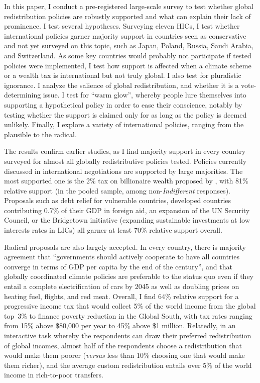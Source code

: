 \documentclass[12pt,english]{article}
\begin{document}
\begin{bibunit}
In this paper, I conduct a pre-registered large-scale survey to test whether global redistribution policies are robustly supported and what can explain their lack of prominence. I test several hypotheses. Surveying eleven HICs, I test whether international policies garner majority support in countries seen as conservative and not yet surveyed on this topic, such as Japan, Poland, Russia, Saudi Arabia, and Switzerland. As some key countries would probably not participate if tested policies were implemented, I test how support is affected when a climate scheme or a wealth tax is international but not truly global. I also test for pluralistic ignorance. I analyze the salience of global redistribution, and whether it is a vote-determining issue. I test for ``warm glow'', whereby people lure themselves into supporting a hypothetical policy in order to ease their conscience, notably by testing whether the support is claimed only for as long as the policy is deemed unlikely. Finally, I explore a variety of international policies, ranging from the plausible to the radical. %

The results confirm earlier studies, as I find majority support in every country surveyed for almost all globally redistributive policies tested. Policies currently discussed in international negotiations are supported by large majorities. The most supported one is the 2\% tax on billionaire wealth proposed by \cite{zucman_blueprint_2024}, with 81\% relative support (in the pooled sample, among non-\textit{Indifferent} responses). Proposals such as debt relief for vulnerable countries, developed countries contributing 0.7\% of their GDP in foreign aid, an expansion of the UN Security Council, or the Bridgetown initiative (expanding sustainable investments at low interests rates in LICs) all garner at least 70\% relative support overall. 

Radical proposals are also largely accepted. In every country, there is majority agreement that ``governments should actively cooperate to have all countries converge in terms of GDP per capita by the end of the century'', and that globally coordinated climate policies are preferable to the status quo even if they entail a complete electrification of cars by 2045 as well as doubling prices on heating fuel, flights, and red meat. Overall, I find 64\% relative support for a progressive income tax that would collect 5\% of the world income from the global top~3\% to finance poverty reduction in the Global South, with tax rates ranging from 15\% above \$80,000 per year to 45\% above \$1 million. Relatedly, in an interactive task whereby the respondents can draw their preferred redistribution of global incomes, almost half of the respondents choose a redistribution that would make them poorer (\textit{versus} less than 10\% choosing one that would make them richer), and the average custom redistribution entails over 5\% of the world income in rich-to-poor transfers. 


\end{bibunit}
\end{document}
